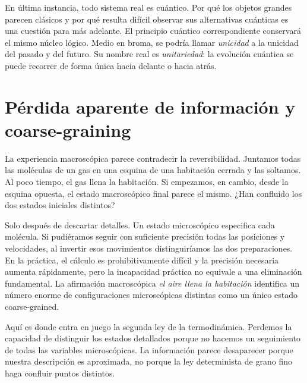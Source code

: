 En última instancia, todo sistema real es cuántico. Por qué los objetos grandes parecen clásicos y por qué resulta difícil observar sus alternativas cuánticas es una cuestión para más adelante. El principio cuántico correspondiente conservará el mismo núcleo lógico. Medio en broma, se podría llamar \emph{unicidad} a la unicidad del pasado y del futuro. Su nombre real es \emph{unitariedad}: la evolución cuántica se puede recorrer de forma única hacia delante o hacia atrás.

\section{Pérdida aparente de información y coarse-graining}

La experiencia macroscópica parece contradecir la reversibilidad. Juntamos todas las moléculas de un gas en una esquina de una habitación cerrada y las soltamos. Al poco tiempo, el gas llena la habitación. Si empezamos, en cambio, desde la esquina opuesta, el estado macroscópico final parece el mismo. ¿Han confluido los dos estados iniciales distintos?

Solo después de descartar detalles. Un estado microscópico especifica cada molécula. Si pudiéramos seguir con suficiente precisión todas las posiciones y velocidades, al invertir esos movimientos distinguiríamos las dos preparaciones. En la práctica, el cálculo es prohibitivamente difícil y la precisión necesaria aumenta rápidamente, pero la incapacidad práctica no equivale a una eliminación fundamental. La afirmación macroscópica \emph{el aire llena la habitación} identifica un número enorme de configuraciones microscópicas distintas como un único estado coarse-grained.

Aquí es donde entra en juego la segunda ley de la termodinámica. Perdemos la capacidad de distinguir los estados detallados porque no hacemos un seguimiento de todas las variables microscópicas. La información parece desaparecer porque nuestra descripción es aproximada, no porque la ley determinista de grano fino haga confluir puntos distintos.

\begin{classroomqa}
\end{classroomqa}


